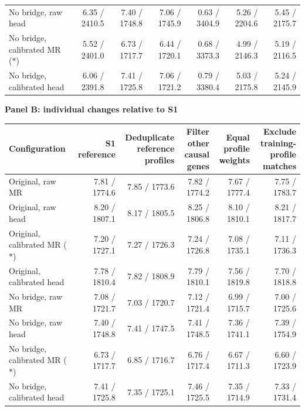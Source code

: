 \begin{landscape}
\begin{table}[p]
\begin{adjustbox}{max width=\linewidth}
\begin{tabular}{lrrrrrr}
No bridge, raw head & 6.35 / 2410.5 & 7.40 / 1748.8 & 7.06 / 1745.9 & 0.63 / 3404.9 & 5.26 / 2204.6 & 5.45 / 2175.7 \\
No bridge, calibrated MR ($\ast$) & 5.52 / 2401.0 & 6.73 / 1717.7 & 6.44 / 1720.1 & 0.68 / 3373.3 & 4.99 / 2146.3 & 5.19 / 2116.5 \\
No bridge, calibrated head & 6.06 / 2391.8 & 7.41 / 1725.8 & 7.06 / 1721.2 & 0.79 / 3380.4 & 5.03 / 2175.8 & 5.24 / 2145.9 \\
\bottomrule
\end{tabular}
\end{adjustbox}
\par\medskip
\textbf{Panel B: individual changes relative to S1}\par\smallskip
\begin{adjustbox}{max width=\linewidth}
\begin{tabular}{lrrrrr}
\toprule
Configuration & S1 reference & \shortstack{Deduplicate\\reference profiles} & \shortstack{Filter other\\causal genes} & \shortstack{Equal profile\\weights} & \shortstack{Exclude training-\\profile matches} \\
\midrule
Original, raw MR & 7.81 / 1774.6 & 7.85 / 1773.6 & 7.82 / 1774.2 & 7.67 / 1777.4 & 7.75 / 1783.7 \\
Original, raw head & 8.20 / 1807.1 & 8.17 / 1805.5 & 8.25 / 1806.8 & 8.10 / 1810.1 & 8.21 / 1817.7 \\
Original, calibrated MR ($\ast$) & 7.20 / 1727.1 & 7.27 / 1726.3 & 7.24 / 1726.8 & 7.08 / 1735.1 & 7.11 / 1736.3 \\
Original, calibrated head & 7.78 / 1810.4 & 7.82 / 1808.9 & 7.79 / 1810.1 & 7.56 / 1819.8 & 7.70 / 1818.8 \\
No bridge, raw MR & 7.08 / 1721.7 & 7.03 / 1720.7 & 7.12 / 1721.4 & 6.99 / 1715.7 & 7.00 / 1725.6 \\
No bridge, raw head & 7.40 / 1748.8 & 7.41 / 1747.5 & 7.41 / 1748.5 & 7.36 / 1741.1 & 7.39 / 1754.9 \\
No bridge, calibrated MR ($\ast$) & 6.73 / 1717.7 & 6.85 / 1716.7 & 6.76 / 1717.4 & 6.67 / 1711.3 & 6.60 / 1723.9 \\
No bridge, calibrated head & 7.41 / 1725.8 & 7.35 / 1725.1 & 7.46 / 1725.5 & 7.35 / 1714.9 & 7.33 / 1731.4 \\
\bottomrule
\end{tabular}
\end{adjustbox}
\end{table}
\clearpage
\end{landscape}
